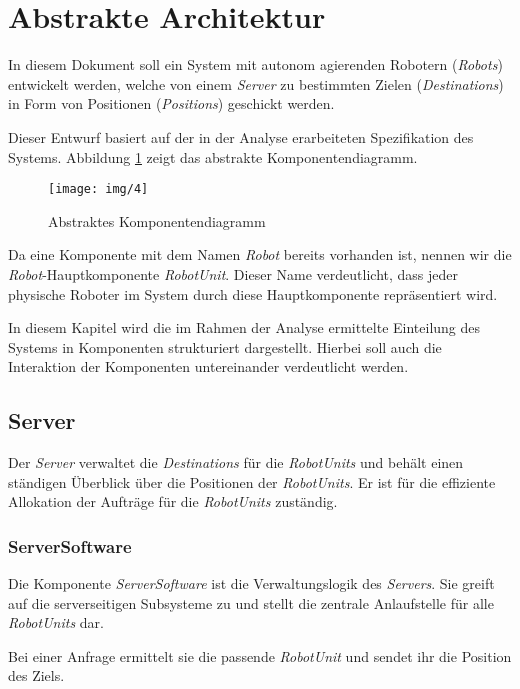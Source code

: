\section{Abstrakte Architektur}
In diesem Dokument soll ein System mit autonom agierenden Robotern (\emph{Robots}) entwickelt werden, welche von einem \emph{Server} zu bestimmten Zielen (\emph{Destinations}) in Form von Positionen (\emph{Positions}) geschickt werden. 

Dieser Entwurf basiert auf der in der Analyse erarbeiteten Spezifikation des Systems. Abbildung \ref{KomponentendiagrammAbstrakt} zeigt das abstrakte Komponentendiagramm.

\begin{figure}[H]
\centering
\texttt{[image: img/4]}
\caption{Abstraktes Komponentendiagramm}
\label{KomponentendiagrammAbstrakt}
\end{figure}

Da eine Komponente mit dem Namen \emph{Robot} bereits vorhanden ist, nennen wir die \emph{Robot}-Hauptkomponente \emph{RobotUnit}. Dieser Name verdeutlicht, dass jeder physische Roboter im System durch diese Hauptkomponente repr\"{a}sentiert wird.


In diesem Kapitel wird die im Rahmen der Analyse ermittelte Einteilung des Systems in Komponenten strukturiert dargestellt. Hierbei soll auch die Interaktion der Komponenten untereinander verdeutlicht werden.

\subsection{Server}

Der \emph{Server} verwaltet die \emph{Destinations} f\"{u}r die \emph{RobotUnits} und beh\"{a}lt einen st\"{a}ndigen \"{U}berblick \"{u}ber die Positionen der \emph{RobotUnits}. Er ist f\"{u}r die effiziente Allokation der Auftr\"{a}ge f\"{u}r die \emph{RobotUnits} zust\"{a}ndig.

\subsubsection{ServerSoftware}

Die Komponente \emph{ServerSoftware} ist die Verwaltungslogik des \emph{Servers}. Sie greift auf die serverseitigen Subsysteme zu und stellt die zentrale Anlaufstelle f\"{u}r alle \emph{RobotUnits} dar. 

Bei einer Anfrage ermittelt sie die passende \emph{RobotUnit} und sendet ihr die Position des Ziels. 

